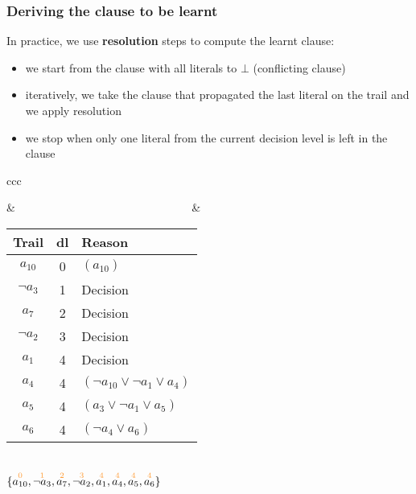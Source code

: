 \begin{frame}
  \frametitle{Deriving the clause to be learnt}

  \scriptsize

  In practice, we use {\bf resolution} steps to compute the learnt clause:
  \begin{itemize}
    \item we start from the clause with all literals to $\bot$ (conflicting clause)
    \item iteratively, we take the clause that propagated the last literal on the trail
	  and we apply resolution
    \item we stop when only one literal from the current decision level is left in the clause 
  \end{itemize}
  \vfill
  \pause
  \begin{tabular}{ccc}
    \begin{minipage}{.4\textwidth}
      \begin{overlayarea}{.4\textwidth}{3cm}
      \only<2|handout:0>{\scalebox{.4}{}}
      \end{overlayarea}
    \end{minipage}
    & ~~~~~~~~~~~~~~~~~~~~~~~~~~~~~~ &
    \begin{minipage}{.4\textwidth}
      \begin{tabular}{ccl}
	\hline
	Trail & dl & Reason \\
	\hline
	$a_{10}$   & 0 & $( a_{10} )$ \\
	$\neg a_3$ & 1 & Decision \\
	$a_7$      & 2 & Decision \\
	$\neg a_2$ & 3 & Decision \\
	$a_1$      & 4 & Decision \\
	$a_4$      & 4 & $(\neg a_{10} \vee \neg a_1 \vee a_4)$ \\
	$a_5$      & 4 & $(a_3 \vee \neg a_1 \vee a_5)$ \\
	$a_6$      & 4 & $(\neg a_4 \vee a_6)$ \\
	\hline
      \end{tabular}
      \medskip \\
      $\{ \dec{a_{10}}{0}, \dec{\neg a_3}{1}, \dec{a_7}{2}, \dec{\neg a_2}{3}, \dec{a_1}{4}, \dec{a_4}{4}, \dec{a_5}{4}, \dec{a_6}{4}\}$
    \end{minipage}
  \end{tabular}
  \vfill

\end{frame}

